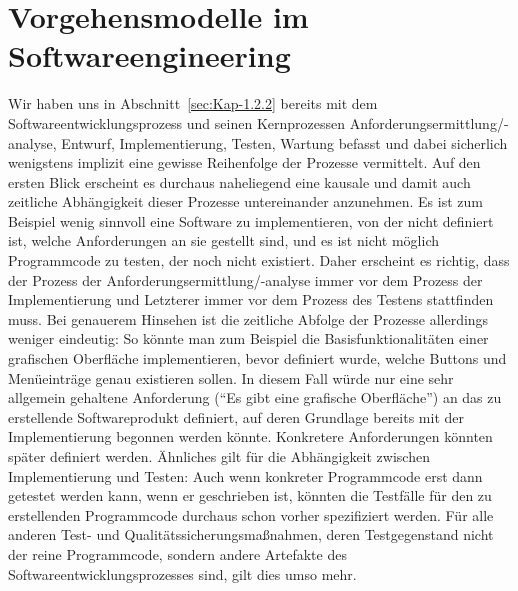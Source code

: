 \cleardoublepage
\chapter{Vorgehensmodelle im Softwareengineering}
\label{sec:Kap-2}

\vspace{-1cm}

Wir haben uns in Abschnitt~\ref{sec:Kap-1.2.2} bereits mit dem Softwareentwicklungsprozess und seinen Kernprozessen Anforderungsermittlung/-analyse, Entwurf, Implementierung, Testen, Wartung befasst und dabei sicherlich wenigstens implizit eine gewisse Reihenfolge der Prozesse vermittelt. Auf den ersten Blick erscheint es durchaus naheliegend eine kausale und damit auch zeitliche Abhängigkeit dieser Prozesse untereinander anzunehmen. Es ist zum Beispiel wenig sinnvoll eine Software zu implementieren, von der nicht definiert ist, welche Anforderungen an sie gestellt sind, und es ist nicht möglich Programmcode zu testen, der noch nicht existiert. Daher erscheint es richtig, dass der Prozess der Anforderungsermittlung/-analyse immer vor dem Prozess der Implementierung und Letzterer immer vor dem Prozess des Testens stattfinden muss. Bei genauerem Hinsehen ist die zeitliche Abfolge der Prozesse allerdings weniger eindeutig: So könnte man zum Beispiel die Basisfunktionalitäten einer grafischen Oberfläche implementieren, bevor definiert wurde, welche Buttons und Menüeinträge genau existieren sollen. In diesem Fall würde nur eine sehr allgemein gehaltene Anforderung ("`Es gibt eine grafische Oberfläche"') an das zu erstellende Softwareprodukt definiert, auf deren Grundlage bereits mit der Implementierung begonnen werden könnte. Konkretere Anforderungen könnten später definiert werden. Ähnliches gilt für die Abhängigkeit zwischen Implementierung und Testen: Auch wenn konkreter Programmcode erst dann getestet werden kann, wenn er geschrieben ist, könnten die Testfälle für den zu erstellenden Programmcode durchaus schon vorher spezifiziert werden. Für alle anderen Test- und Qualitätssicherungsmaßnahmen, deren Testgegenstand nicht der reine Programmcode, sondern andere Artefakte des Softwareentwicklungsprozesses sind, gilt dies umso mehr.


